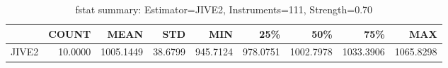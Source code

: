 \begin{table}[ht]
\centering
\caption{fstat summary: Estimator=JIVE2, Instruments=111, Strength=0.70}
\begin{tabular}{lrrrrrrrr}
\toprule
 & COUNT & MEAN & STD & MIN & 25\% & 50\% & 75\% & MAX \\
\midrule
JIVE2 & 10.0000 & 1005.1449 & 38.6799 & 945.7124 & 978.0751 & 1002.7978 & 1033.3906 & 1065.8298 \\
\bottomrule
\end{tabular}
\end{table}
